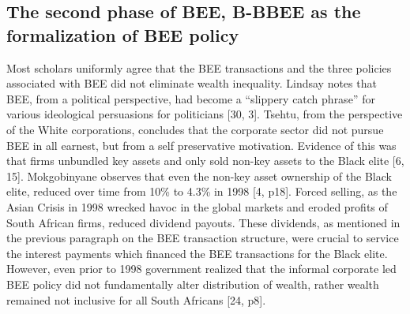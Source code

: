\subsection{The second phase of BEE, B-BBEE as the formalization of BEE policy}
Most scholars uniformly agree that the BEE transactions and the three policies associated with BEE did not eliminate wealth inequality. Lindsay notes that BEE, from a political perspective, had become a “slippery catch phrase” for various ideological persuasions for politicians [30, 3]. Tsehtu, from the perspective of the White corporations, concludes that the corporate sector did not pursue BEE in all earnest, but from a self preservative motivation. Evidence of this was that firms unbundled key assets and only sold non-key assets to the Black elite [6, 15]. Mokgobinyane observes that even the non-key asset ownership of the Black elite, reduced over time from 10\% to 4.3\% in 1998 [4, p18]. Forced selling, as the Asian Crisis in 1998 wrecked havoc in the global markets and eroded profits of South African firms, reduced dividend payouts. These dividends, as mentioned in the previous paragraph on the BEE transaction structure, were crucial to service the interest payments which financed the BEE transactions for the Black elite. However, even prior to 1998 government realized that the informal corporate led BEE policy did not fundamentally alter distribution of wealth, rather wealth remained not inclusive for all South Africans [24, p8].

